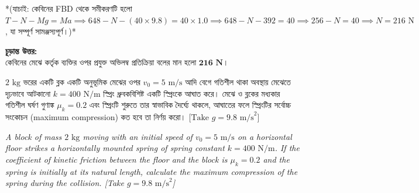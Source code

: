 \documentclass[12pt, a4paper]{article}
\begin{document}
\begin{tcolorbox}[solutionbox={সমাধান (Solution)}]
*(যাচাই: কেবিনের FBD থেকে সমীকরণটি হলো $T - N - Mg = Ma \implies 648 - N - (40 \times 9.8) = 40 \times 1.0 \implies 648 - N - 392 = 40 \implies 256 - N = 40 \implies N = 216\text{ N}$, যা সম্পূর্ণ সামঞ্জস্যপূর্ণ।)*

\vspace{1em}
\begin{tcolorbox}[answerbox]
\textbf{চূড়ান্ত উত্তর:} \\
কেবিনের মেঝে কর্তৃক ব্যক্তির ওপর প্রযুক্ত অভিলম্ব প্রতিক্রিয়া বলের মান হলো $\mathbf{216\text{ N}}$।
\end{tcolorbox}
\end{tcolorbox}

\begin{tcolorbox}[questionbox={প্রশ্ন (Question) 15}]
\noindent
$2\text{ kg}$ ভরের একটি ব্লক একটি অনুভূমিক মেঝের ওপর $v_0 = 5\text{ m/s}$ আদি বেগে গতিশীল থাকা অবস্থায় মেঝেতে দৃঢ়ভাবে আটকানো $k = 400\text{ N/m}$ স্প্রিং ধ্রুবকবিশিষ্ট একটি স্প্রিংকে আঘাত করে। মেঝে ও ব্লকের মধ্যকার গতিশীল ঘর্ষণ গুণাঙ্ক $\mu_k = 0.2$ এবং স্প্রিংটি শুরুতে তার স্বাভাবিক দৈর্ঘ্যে থাকলে, আঘাতের ফলে স্প্রিংটির সর্বোচ্চ সংকোচন (maximum compression) কত হবে তা নির্ণয় করো। [$\text{Take } g = 9.8\text{ m/s}^2$]

\vspace{0.8em}
\begin{english}
\noindent\textit{\color{darkgray}
A block of mass $2\text{ kg}$ moving with an initial speed of $v_0 = 5\text{ m/s}$ on a horizontal floor strikes a horizontally mounted spring of spring constant $k = 400\text{ N/m}$. If the coefficient of kinetic friction between the floor and the block is $\mu_k = 0.2$ and the spring is initially at its natural length, calculate the maximum compression of the spring during the collision. [Take $g = 9.8\text{ m/s}^2$]
}
\end{english}
\end{tcolorbox}
\end{document}
